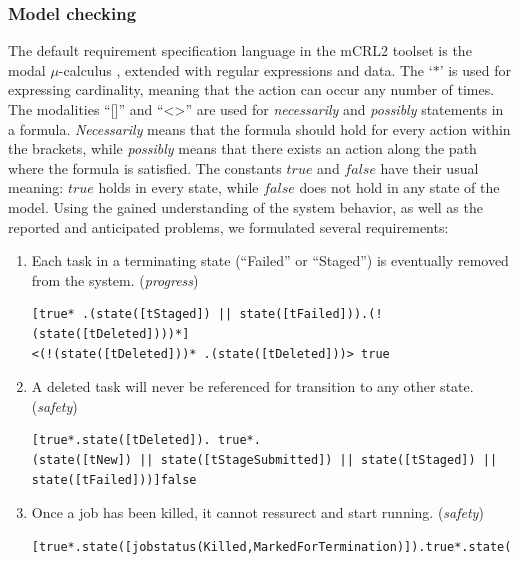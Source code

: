 \documentclass[10pt,conference]{IEEEtran}
\begin{document}
\subsubsection{Model checking}
The default requirement specification language in the mCRL2 toolset
is the modal $\mu$-calculus \cite{ProcessesWithData}, extended with regular expressions and data.
The `$\ast$' is used for expressing cardinality,
meaning that the action can occur any number of times. The modalities ``[]''
and ``\textless\textgreater'' are used for \textit{necessarily} and 
\textit{possibly} statements in a formula. \textit{Necessarily} means that
the formula should hold for every action within the brackets, while
\textit{possibly} means that there exists an action along the path where
the formula is satisfied. The constants $true$ and $false$ have their 
usual meaning: $true$ holds in every state, while $false$ 
does not hold in any state of the model.
Using the gained understanding of the system behavior, as well as the 
reported and anticipated problems, we formulated several requirements:

\renewcommand{\labelenumi}{\arabic{enumi}.}

\begin{enumerate}
\item Each task in a terminating state (``Failed'' or ``Staged'') is eventually removed from the system. (\textit{progress})

\begin{lstlisting}[basicstyle=\ttfamily\fontsize{8}{9}\selectfont]
[true* .(state([tStaged]) || state([tFailed])).(!(state([tDeleted])))*] 
<(!(state([tDeleted]))* .(state([tDeleted]))> true
\end{lstlisting} 

\item A deleted task will never be referenced for transition to any other state. (\textit{safety})
\begin{lstlisting}[basicstyle=\ttfamily\fontsize{8}{9}\selectfont]
[true*.state([tDeleted]). true*. 
(state([tNew]) || state([tStageSubmitted]) || state([tStaged]) || state([tFailed]))]false
\end{lstlisting}
\item Once a job has been killed, it cannot ressurect and start running. (\textit{safety})

\begin{lstlisting}[basicstyle=\ttfamily\fontsize{8}{9}\selectfont]
[true*.state([jobstatus(Killed,MarkedForTermination)]).true*.state([jobstatus(Running,JobInitialization)])]false
\end{lstlisting} 

\end{enumerate}
\end{document}
